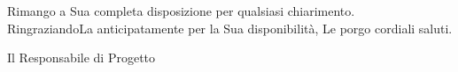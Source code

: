 \documentclass{letter}
\begin{document}
\begin{letter}{}
	Rimango a Sua completa disposizione per qualsiasi chiarimento.\\
	RingraziandoLa anticipatamente per la Sua disponibilità, Le porgo cordiali saluti.
	
	\closing{
		Il Responsabile di Progetto \\ [1cm]
		 \\
	}

\end{letter}
\end{document}
